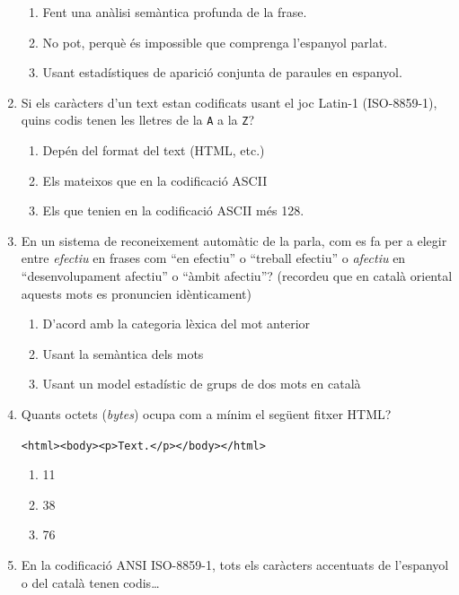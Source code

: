 \begin{enumerate}
\begin{enumerate}
\item Fent una anàlisi semàntica profunda de la frase.
\item No pot, perquè és impossible que comprenga l'espanyol parlat.
\item Usant estadístiques de aparició conjunta de paraules
      en espanyol.
\end{enumerate}

\item 
   Si els caràcters d'un text estan codificats usant el joc Latin-1
   (ISO-8859-1), quins codis tenen les lletres de la \verb|A| a
   la \verb|Z|?
   
\begin{enumerate}
\item Depén del format del text (HTML, etc.)
\item Els mateixos que en la codificació ASCII
\item Els que tenien en la codificació ASCII més 128.
\end{enumerate}

\item En un sistema de reconeixement automàtic de la parla, com es
  fa per a elegir entre \emph{efectiu} en frases com ``en efectiu''
  o ``treball efectiu'' o \emph{afectiu} en ``desenvolupament
  afectiu'' o ``àmbit afectiu''? (recordeu que en català oriental
  aquests mots es pronuncien idènticament)
  
\begin{enumerate}
\item D'acord amb la categoria lèxica del mot anterior
\item Usant la semàntica dels mots
\item Usant un model estadístic de grups de dos mots en català
\end{enumerate}

\item 
   Quants octets (\emph{bytes}) ocupa com a mínim el següent fitxer HTML?
   \begin{center}
   \verb|<html><body><p>Text.</p></body></html>|
   \end{center}
   
\begin{enumerate}
\item 11
\item 38
\item 76
\end{enumerate}

\item En la codificació ANSI ISO-8859-1, tots els caràcters
   accentuats  de l'espanyol o del català tenen codis{\ldots}
   

\end{enumerate}
